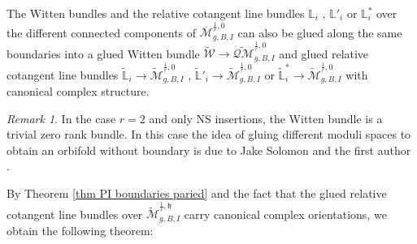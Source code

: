 \documentclass[11pt]{amsart}
\theoremstyle{definition}
\theoremstyle{remark}
\newtheorem{rmk}[dummy]{Remark}
\newcommand{\<}{\left<}
\renewcommand{\>}{\right>}
\numberwithin{equation}{section}
\def\Mbar{{\overline{\mathcal M}}}
\def\h{{\mathfrak h}}
\begin{document}
    
    The Witten bundles and the relative cotangent line bundles $\mathbb L_i$%
, $\mathbb L'_i$ or %
$\mathbb L_i^*$ over the different connected components of $\Mbar^{\frac{1}{r},0}_{g,B,I}$  can also be glued along the same boundaries into a glued Witten bundle $\widetilde{\mathcal W}\to\widetilde{\mathcal {QM}}^{\frac{1}{r},0}_{g,B,I}$ and glued relative cotangent line bundles $\widetilde{\mathbb L}_i\to\widetilde{\mathcal M}^{\frac{1}{r},0}_{g,B,I}$%
, $\widetilde{\mathbb L}'_i\to\widetilde{\mathcal M}^{\frac{1}{r},0}_{g,B,I}$ or %
$\widetilde{\mathbb L}^*_i\to\widetilde{\mathcal M}^{\frac{1}{r},0}_{g,B,I}$ with canonical complex structure.
\begin{rmk}
In the case $r=2$ and only %
NS insertions, the %
Witten bundle is a trivial zero rank bundle. In this case the idea of gluing different moduli spaces to obtain an orbifold without boundary is due to Jake Solomon and the %
first  author %
\cite{ST_unpublished}. 
\end{rmk}
     By Theorem \ref{thm  PI boundaries paried} and the fact that the glued relative cotangent line %
bundles over $\widetilde{\mathcal M}^{\frac{1}{r},\h}_{g,B,I}$ carry canonical complex orientations, we obtain the following theorem:
\end{document}
